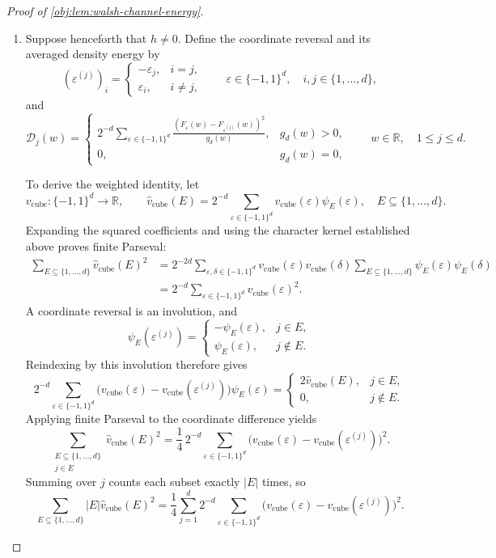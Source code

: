 \begin{proof}[Proof of \cref{obj:lem:walsh-channel-energy}]
\begin{enumerate}
\item Suppose henceforth that \(h\ne0\). Define the coordinate reversal and its averaged density energy by
\[
(\varepsilon^{(j)})_i=
\begin{cases}
-\varepsilon_j,&i=j,\\
\varepsilon_i,&i\ne j,
\end{cases}
\qquad
\varepsilon\in\{-1,1\}^d,\quad i,j\in\{1,\ldots,d\},
\]
and
\[
\mathcal D_j(w)=
\begin{cases}
2^{-d}\displaystyle\sum_{\varepsilon\in\{-1,1\}^d}
\frac{(F_\varepsilon(w)-F_{\varepsilon^{(j)}}(w))^2}{g_d(w)},
&g_d(w)>0,\\
0,&g_d(w)=0,
\end{cases}
\qquad w\in\mathbb R,\quad 1\le j\le d.
\]

To derive the weighted identity, let
\[
v_{\mathrm{cube}}:\{-1,1\}^d\longrightarrow\mathbb R,
\qquad
\widehat v_{\mathrm{cube}}(E)
=
2^{-d}\sum_{\varepsilon\in\{-1,1\}^d}
v_{\mathrm{cube}}(\varepsilon)\psi_E(\varepsilon),
\quad E\subseteq\{1,\ldots,d\}.
\]
Expanding the squared coefficients and using the character kernel established above proves finite Parseval:
\[
\begin{aligned}
\sum_{E\subseteq\{1,\ldots,d\}}
\widehat v_{\mathrm{cube}}(E)^2
&=
2^{-2d}\sum_{\varepsilon,\delta\in\{-1,1\}^d}
v_{\mathrm{cube}}(\varepsilon)v_{\mathrm{cube}}(\delta)
\sum_{E\subseteq\{1,\ldots,d\}}
\psi_E(\varepsilon)\psi_E(\delta)\\
&=
2^{-d}\sum_{\varepsilon\in\{-1,1\}^d}
v_{\mathrm{cube}}(\varepsilon)^2.
\end{aligned}
\]
A coordinate reversal is an involution, and
\[
\psi_E(\varepsilon^{(j)})
=
\begin{cases}
-\psi_E(\varepsilon),&j\in E,\\
\psi_E(\varepsilon),&j\notin E.
\end{cases}
\]
Reindexing by this involution therefore gives
\[
2^{-d}\sum_{\varepsilon\in\{-1,1\}^d}
\bigl(v_{\mathrm{cube}}(\varepsilon)
-v_{\mathrm{cube}}(\varepsilon^{(j)})\bigr)\psi_E(\varepsilon)
=
\begin{cases}
2\widehat v_{\mathrm{cube}}(E),&j\in E,\\
0,&j\notin E.
\end{cases}
\]
Applying finite Parseval to the coordinate difference yields
\[
\sum_{\substack{E\subseteq\{1,\ldots,d\}\\j\in E}}
\widehat v_{\mathrm{cube}}(E)^2
=
\frac14\,2^{-d}\sum_{\varepsilon\in\{-1,1\}^d}
\bigl(v_{\mathrm{cube}}(\varepsilon)
-v_{\mathrm{cube}}(\varepsilon^{(j)})\bigr)^2.
\]
Summing over \(j\) counts each subset exactly \(|E|\) times, so
\[
\sum_{E\subseteq\{1,\ldots,d\}}
|E|\widehat v_{\mathrm{cube}}(E)^2
=
\frac14\sum_{j=1}^d2^{-d}
\sum_{\varepsilon\in\{-1,1\}^d}
\bigl(v_{\mathrm{cube}}(\varepsilon)
-v_{\mathrm{cube}}(\varepsilon^{(j)})\bigr)^2.
\]


\end{enumerate}
\end{proof}
